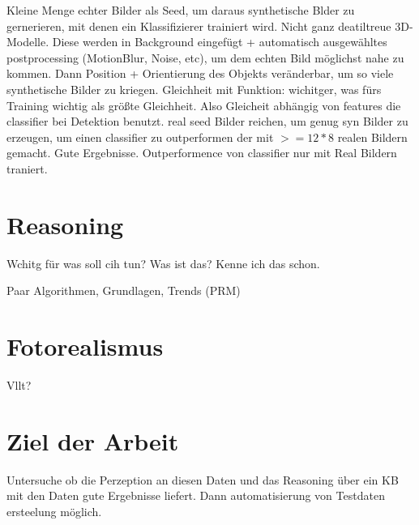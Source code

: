 \cite{synthImg} \newline
Kleine Menge echter Bilder als Seed, um daraus synthetische Blder zu gernerieren, mit denen ein Klassifizierer trainiert wird. \newline
Nicht ganz deatiltreue 3D-Modelle. Diese werden in Background eingefügt + automatisch ausgewähltes postprocessing (MotionBlur, Noise, etc), um dem echten Bild möglichst nahe zu kommen. Dann Position + Orientierung des Objekts veränderbar, um so viele synthetische Bilder zu kriegen. \newline
Gleichheit mit Funktion: wichitger, was fürs Training wichtig als größte Gleichheit. Also Gleicheit abhängig von features die classifier bei Detektion benutzt.  real seed Bilder reichen, um genug syn Bilder zu erzeugen, um einen classifier zu outperformen der mit $>=12*8$ realen Bildern gemacht. \newline
Gute Ergebnisse. Outperformence von classifier nur mit Real Bildern traniert. 


\section{Reasoning}

Wchitg für was soll cih tun? Was ist das? Kenne ich das schon.

Paar Algorithmen, Grundlagen, Trends (PRM) 

\section{Fotorealismus}

Vllt?

\section{Ziel der Arbeit}
\label{sec:goal}

Untersuche ob die Perzeption an diesen Daten und das Reasoning über ein KB mit den Daten gute Ergebnisse liefert. Dann automatisierung von Testdaten ersteelung möglich. 